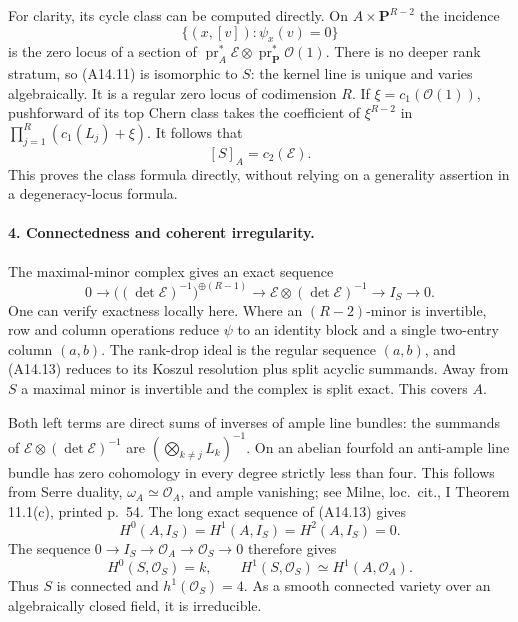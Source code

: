 \documentclass[11pt]{article}
\theoremstyle{remark}\newtheorem{remark}[theorem]{Remark}
\begin{document}
For clarity, its cycle class can be computed directly. On
$A\times\mathbf P^{R-2}$ the incidence
\[
                    \{(x,[v]):\psi_x(v)=0\}
                                                               \tag{A14.11}
\]
is the zero locus of a section of
$\operatorname{pr}_A^*\mathcal E\otimes
 \operatorname{pr}_{\mathbf P}^*\mathcal O(1)$.
There is no deeper rank stratum, so (A14.11) is isomorphic to
$S$: the kernel line is unique and varies algebraically.
It is a regular zero locus of codimension $R$. If
$\xi=c_1(\mathcal O(1))$, pushforward of its top Chern class
takes the coefficient of $\xi^{R-2}$ in
$\prod_{j=1}^R(c_1(L_j)+\xi)$. It follows that
\[
                    [S]_A=c_2(\mathcal E).
                                                               \tag{A14.12}
\]
This proves the class formula directly, without relying on a
generality assertion in a degeneracy-locus formula.

\paragraph{4. Connectedness and coherent irregularity.}
The maximal-minor complex gives an exact sequence
\[
 0\longrightarrow
       \big((\det\mathcal E)^{-1}\big)^{\oplus(R-1)}
   \longrightarrow \mathcal E\otimes(\det\mathcal E)^{-1}
   \longrightarrow I_S\longrightarrow0.                      \tag{A14.13}
\]
One can verify exactness locally here. Where an $(R-2)$-minor
is invertible, row and column operations reduce $\psi$ to an
identity block and a single two-entry column $(a,b)$.
The rank-drop ideal is the regular sequence $(a,b)$, and
(A14.13) reduces to its Koszul resolution plus split acyclic
summands. Away from $S$ a maximal minor is invertible and the
complex is split exact. This covers $A$.

Both left terms are direct sums of inverses of ample line
bundles: the summands of
$\mathcal E\otimes(\det\mathcal E)^{-1}$ are
$(\bigotimes_{k\ne j}L_k)^{-1}$. On an abelian fourfold an
anti-ample line bundle has zero cohomology in every degree
strictly less than four. This follows from Serre duality,
$\omega_A\simeq\mathcal O_A$, and ample vanishing; see Milne,
loc.\ cit., I Theorem 11.1(c), printed p.~54.
The long exact sequence of (A14.13) gives
\[
          H^0(A,I_S)=H^1(A,I_S)=H^2(A,I_S)=0.
                                                               \tag{A14.14}
\]
The sequence $0\to I_S\to\mathcal O_A\to\mathcal O_S\to0$
therefore gives
\[
             H^0(S,\mathcal O_S)=k,\qquad
             H^1(S,\mathcal O_S)\simeq H^1(A,\mathcal O_A).
                                                               \tag{A14.15}
\]
Thus $S$ is connected and $h^1(\mathcal O_S)=4$.
As a smooth connected variety over an algebraically closed
field, it is irreducible.
\end{document}
